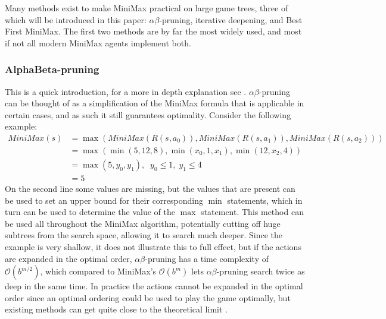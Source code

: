 Many methods exist to make MiniMax practical on large game trees, three of which will be introduced in this paper: $\alpha\beta$-pruning, iterative deepening, and Best First MiniMax.  The first two methods are by far the most widely used, and most if not all modern MiniMax agents implement both.

\subsubsection{AlphaBeta-pruning}
This is a quick introduction, for a more in depth explanation see \cite[p. 198]{russellnorvig}.
$\alpha\beta$-pruning can be thought of as a simplification of the MiniMax formula that is applicable in certain cases, and as such it still guarantees optimality. Consider the following example:
\begin{align*}
    MiniMax(s) &= \max(MiniMax(R(s, a_0)), MiniMax(R(s, a_1)), 
    MiniMax(R(s, a_2))) \\
    &= \max(\min(5, 12, 8), \min(x_0, 1, x_1), \min(12, x_2, 4)) \\
    &= \max(5, y_0, y_1), \;\; y_0 \leq 1, \; y_1 \leq 4 \\
    &= 5
\end{align*}
On the second line some values are missing, but the values that are present can be used to set an upper bound for their corresponding $\min$ statements, which in turn can be used to determine the value of the $\max$ statement. This method can be used all throughout the MiniMax algorithm, potentially cutting off huge subtrees from the search space, allowing it to search much deeper. Since the example is very shallow, it does not illustrate this to full effect, but if the actions are expanded in the optimal order, $\alpha\beta$-pruning has a time complexity of $\mathcal{O}(b^{m/2})$, which compared to MiniMax's $\mathcal{O}(b^{m})$ lets $\alpha\beta$-pruning search twice as deep in the same time. In practice the actions cannot be expanded in the optimal order since an optimal ordering could be used to play the game optimally, but existing methods can get quite close to the theoretical limit \cite[p. 201]{russellnorvig}.



